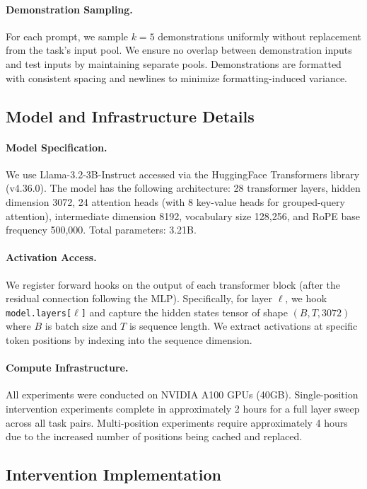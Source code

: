\documentclass[runningheads]{llncs}
\begin{document}
\paragraph{Demonstration Sampling.} For each prompt, we sample $k=5$ demonstrations uniformly without replacement from the task's input pool. We ensure no overlap between demonstration inputs and test inputs by maintaining separate pools. Demonstrations are formatted with consistent spacing and newlines to minimize formatting-induced variance.

\subsection{Model and Infrastructure Details}

\paragraph{Model Specification.} We use Llama-3.2-3B-Instruct accessed via the HuggingFace Transformers library (v4.36.0). The model has the following architecture: 28 transformer layers, hidden dimension 3072, 24 attention heads (with 8 key-value heads for grouped-query attention), intermediate dimension 8192, vocabulary size 128,256, and RoPE base frequency 500,000. Total parameters: 3.21B.

\paragraph{Activation Access.} We register forward hooks on the output of each transformer block (after the residual connection following the MLP). Specifically, for layer $\ell$, we hook \texttt{model.layers[$\ell$]} and capture the hidden states tensor of shape $(B, T, 3072)$ where $B$ is batch size and $T$ is sequence length. We extract activations at specific token positions by indexing into the sequence dimension.

\paragraph{Compute Infrastructure.} All experiments were conducted on NVIDIA A100 GPUs (40GB). Single-position intervention experiments complete in approximately 2 hours for a full layer sweep across all task pairs. Multi-position experiments require approximately 4 hours due to the increased number of positions being cached and replaced.

\subsection{Intervention Implementation}
\end{document}
